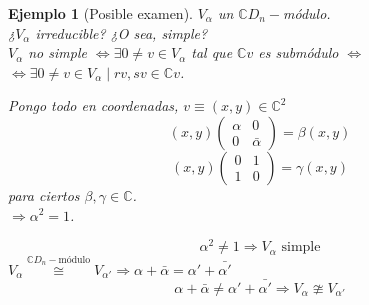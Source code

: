 \documentclass[11pt,a4paper]{article}
\theoremstyle{break}
\newtheorem{example}[theorem]{Ejemplo}
\begin{document}
\begin{example}[Posible examen]
$V_{\alpha}$ un $\mathbb{C}D_{n}-$módulo. \\
¿$V_{\alpha}$ irreducible? ¿O sea, simple? \\
$V_{\alpha}$ no simple $\iff \exists 0 \neq v \in V_{\alpha}$ tal que $\mathbb{C}v$ es submódulo $\iff$ \\ $\iff \exists 0 \neq v \in V_{\alpha} \mid rv, sv \in \mathbb{C}v$.

Pongo todo en coordenadas, $v \equiv (x, y) \in \mathbb{C}^{2}$
$$(x, y) \begin{pmatrix}
\alpha & 0 \\
0 & \bar{\alpha}
\end{pmatrix} = \beta(x, y)$$
$$(x, y) \begin{pmatrix}
0 & 1 \\
1 & 0
\end{pmatrix} = \gamma(x, y)$$
para ciertos $\beta, \gamma \in \mathbb{C}$. \\
$\Rightarrow \alpha^{2} = 1$.

$$\alpha^{2} \neq 1 \Rightarrow V_{\alpha} \text{ simple}$$
$V_{\alpha} \overset{\mathbb{C}D_{n}-\text{módulo}}{\cong} V_{\alpha'} \Rightarrow \alpha + \bar{\alpha} = \alpha' + \bar{\alpha'}$
$$\alpha + \bar{\alpha} \neq \alpha' + \bar{\alpha'} \Rightarrow V_{\alpha} \ncong V_{\alpha'}$$


\end{example}
\end{document}
